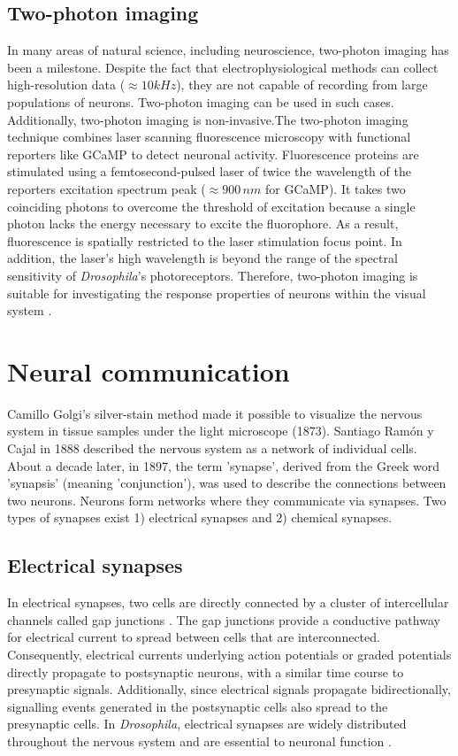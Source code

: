 \subsection{Two-photon imaging}
In many areas of natural science, including neuroscience, two-photon imaging \parencite{Denk1990} has been a milestone. Despite the fact that electrophysiological methods can collect high-resolution data ($\approx 10kHz$), they are not capable of recording from large populations of neurons. Two-photon imaging can be used in such cases. Additionally, two-photon imaging is non-invasive.The two-photon imaging technique combines laser scanning fluorescence microscopy with functional reporters like GCaMP to detect neuronal activity. Fluorescence proteins are stimulated using a femtosecond-pulsed laser of twice the wavelength of the reporters excitation spectrum peak ($\approx 900 \, nm$ for GCaMP). It takes two coinciding photons to overcome the threshold of excitation because a single photon lacks the energy necessary to excite the fluorophore. As a result, fluorescence is spatially restricted to the laser stimulation focus point. In addition, the laser's high wavelength is beyond the range of the spectral sensitivity of \textit{Drosophila}'s photoreceptors. Therefore, two-photon imaging is suitable for investigating the response properties of neurons within the visual system \parencite{Maisak2013, Reiff2010, Strother2018}.

\section{Neural communication}
Camillo Golgi's silver-stain method made it possible to visualize the nervous system in tissue samples under the light microscope (1873). Santiago Ramón y Cajal in 1888 described the nervous system as a network of individual cells. About a decade later, in 1897, the term 'synapse', derived from the Greek word 'synapsis' (meaning 'conjunction'), was used to describe the connections between two neurons. Neurons form networks where they communicate via synapses. Two types of synapses exist 1) electrical synapses and 2) chemical synapses.

\subsection{Electrical synapses}
In electrical synapses, two cells are directly connected by a cluster of intercellular channels called gap junctions \parencite{Bennett2004}. The gap junctions provide a conductive pathway for electrical current to spread between cells that are interconnected. Consequently, electrical currents underlying action potentials or graded potentials directly propagate to postsynaptic neurons, with a similar time course to presynaptic signals. Additionally, since electrical signals propagate bidirectionally, signalling events generated in the postsynaptic cells also spread to the presynaptic cells. In \textit{Drosophila}, electrical synapses are widely distributed throughout the nervous system and are essential to neuronal function \parencite{Ammer2022, Stebbings2002, Liu2016}.

